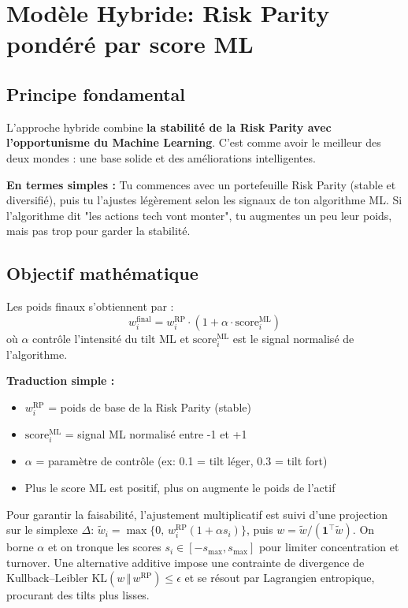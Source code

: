 \documentclass[11pt,a4paper]{article}
\begin{document}
\FloatBarrier
\section{Modèle Hybride: Risk Parity pondéré par score ML}

\subsection{Principe fondamental}
L'approche hybride combine \textbf{la stabilité de la Risk Parity avec l'opportunisme du Machine Learning}. C'est comme avoir le meilleur des deux mondes : une base solide et des améliorations intelligentes.

\textbf{En termes simples :} Tu commences avec un portefeuille Risk Parity (stable et diversifié), puis tu l'ajustes légèrement selon les signaux de ton algorithme ML. Si l'algorithme dit "les actions tech vont monter", tu augmentes un peu leur poids, mais pas trop pour garder la stabilité.

\subsection{Objectif mathématique}
Les poids finaux s'obtiennent par :
\[w_i^{\text{final}} = w_i^{\text{RP}} \cdot (1 + \alpha \cdot \text{score}_i^{\text{ML}})\]
où \(\alpha\) contrôle l'intensité du tilt ML et \(\text{score}_i^{\text{ML}}\) est le signal normalisé de l'algorithme.

\textbf{Traduction simple :} 
\begin{itemize}
\item \(w_i^{\text{RP}}\) = poids de base de la Risk Parity (stable)
\item \(\text{score}_i^{\text{ML}}\) = signal ML normalisé entre -1 et +1
\item \(\alpha\) = paramètre de contrôle (ex: 0.1 = tilt léger, 0.3 = tilt fort)
\item Plus le score ML est positif, plus on augmente le poids de l'actif
\end{itemize}
\noindent Pour garantir la faisabilité, l'ajustement multiplicatif est suivi d'une projection sur le simplexe \(\Delta\): \(\tilde w_i = \max\{0,\, w_i^{\text{RP}} (1+\alpha s_i)\}\), puis \(w=\tilde w / (\mathbf{1}^\top \tilde w)\). On borne \(\alpha\) et on tronque les scores \(s_i\in[-s_{\max}, s_{\max}]\) pour limiter concentration et turnover. Une alternative additive impose une contrainte de divergence de Kullback–Leibler \(\text{KL}(w\,\Vert\,w^{\text{RP}})\le \epsilon\) et se résout par Lagrangien entropique, procurant des tilts plus lisses.
\end{document}
